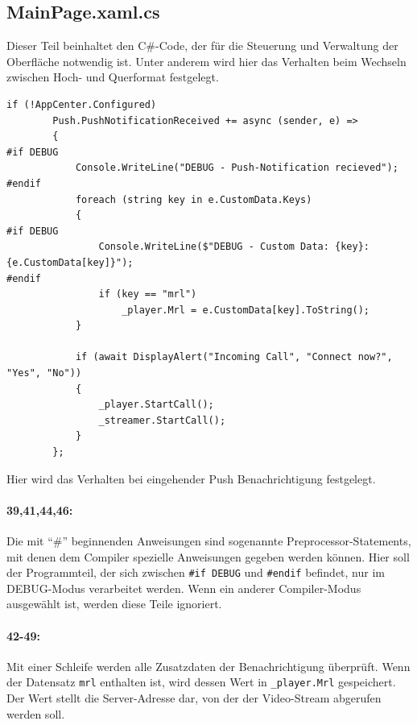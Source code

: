 \subsection{MainPage.xaml.cs}
Dieser Teil beinhaltet den C\#-Code, der für die Steuerung und Verwaltung der Oberfläche notwendig ist.
Unter anderem wird hier das Verhalten beim Wechseln zwischen Hoch- und Querformat festgelegt.
\begin{lstlisting}[firstnumber=36]
    if (!AppCenter.Configured)
        Push.PushNotificationReceived += async (sender, e) =>
        {
#if DEBUG
            Console.WriteLine("DEBUG - Push-Notification recieved");
#endif
            foreach (string key in e.CustomData.Keys)
            {
#if DEBUG
                Console.WriteLine($"DEBUG - Custom Data: {key}:{e.CustomData[key]}");
#endif
                if (key == "mrl")
                    _player.Mrl = e.CustomData[key].ToString();
            }

            if (await DisplayAlert("Incoming Call", "Connect now?", "Yes", "No"))
            {
                _player.StartCall();
                _streamer.StartCall();
            }
        };
\end{lstlisting}
Hier wird das Verhalten bei eingehender Push Benachrichtigung festgelegt.
\paragraph{39,41,44,46:} Die mit \enquote{\#} beginnenden Anweisungen sind sogenannte Preprocessor-Statements, mit denen dem Compiler spezielle Anweisungen gegeben werden können.
Hier soll der Programmteil, der sich zwischen \texttt{\#if DEBUG} und \texttt{\#endif} befindet, nur im DEBUG-Modus verarbeitet werden.
Wenn ein anderer Compiler-Modus ausgewählt ist, werden diese Teile ignoriert.
\paragraph{42-49:} Mit einer Schleife werden alle Zusatzdaten der Benachrichtigung überprüft.
Wenn der Datensatz \texttt{mrl} enthalten ist, wird dessen Wert in \texttt{\_player.Mrl} gespeichert.
Der Wert stellt die Server-Adresse dar, von der der Video-Stream abgerufen werden soll.
